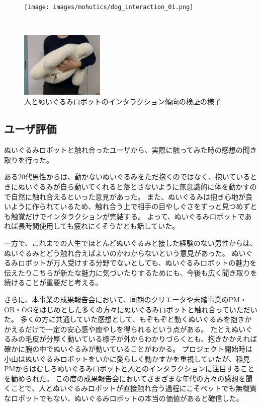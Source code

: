 \documentclass[uplatex,a4paper,12pt]{jsarticle}
\begin{document}
\begin{figure}[htbp]
  \centering
  \begin{minipage}[c]{0.96\linewidth}
    \centering
    \texttt{[image: images/mohutics/dog\_interaction\_01.png]}
  \end{minipage} \\
  \begin{minipage}[c]{0.96\linewidth}
    \centering
    \includegraphics[keepaspectratio,width=4cm,clip]{images/mohutics/funio_interaction_01.png}
  \end{minipage}
  \caption{人とぬいぐるみロボットのインタラクション傾向の検証の様子}
  \label{fig:mohutics:interaction}
\end{figure}



\subsection{ユーザ評価}
ぬいぐるみロボットと触れ合ったユーザから、実際に触ってみた時の感想の聞き取りを行った。

ある20代男性からは、動かないぬいぐるみをただ抱くのではなく、抱いているときにぬいぐるみが自ら動いてくれると落とさないように無意識的に体を動かすので自然に触れ合えるといった意見があった。
また、ぬいぐるみは抱き心地が良いように作られているため、触れ合う上で相手の目やしぐさをずっと見つめずとも触覚だけでインタラクションが完結する。
よって、ぬいぐるみロボットであれば長時間使用しても疲れにくそうだとも話していた。

一方で、これまでの人生でほとんどぬいぐるみと接した経験のない男性からは、ぬいぐるみとどう触れ合えばよいのかわからないという意見があった。
ぬいぐるみロボットが万人受けする分野でないとしても、ぬいぐるみロボットの魅力を伝えたりこちらが新たな魅力に気づいたりするためにも、今後も広く聞き取りを続けることが重要だと考える。

さらに、本事業の成果報告会において、同期のクリエータや未踏事業のPM・OB・OGをはじめとした多くの方々にぬいぐるみロボットと触れ合っていただいた。
多くの方に共通していた感想として、もぞもぞと動くぬいぐるみを抱きかかえるだけで一定の安心感や癒やしを得られるという点がある。
たとえぬいぐるみの毛皮が分厚く動いている様子が外からわかりづらくとも、抱きかかえれば確かに腕の中でぬいぐるみが動いていることがわかる。
プロジェクト開始時は小山はぬいぐるみロボットをいかに愛らしく動かすかを重視していたが、稲見PMからはむしろぬいぐるみロボットと人とのインタラクションに注目することを勧められた。
この度の成果報告会においてさまざまな年代の方々の感想を聞くことで、人とぬいぐるみロボットが直接触れ合う過程にこそペットでも無機質なロボットでもない、ぬいぐるみロボットの本当の価値があると確信した。
\end{document}
